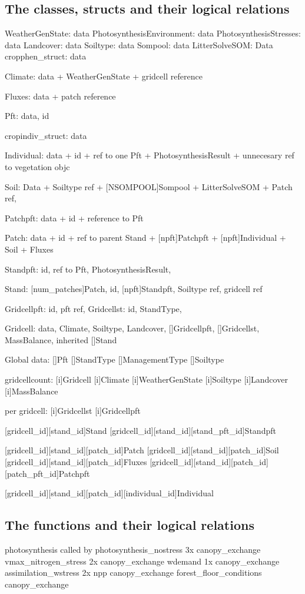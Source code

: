 \subsection{The classes, structs and their logical relations}
WeatherGenState: data
PhotosynthesisEnvironment: data
PhotosynthesisStresses: data
Landcover: data
Soiltype: data
Sompool: data
LitterSolveSOM: Data
cropphen_struct: data

Climate: data + WeatherGenState + gridcell reference

Fluxes: data + patch reference

Pft: data, id

cropindiv_struct: data

Individual: data + id + ref to one Pft + PhotosynthesisResult + unnecesary ref to vegetation objc

Soil: Data + Soiltype ref + [NSOMPOOL]Sompool + LitterSolveSOM + Patch ref,

Patchpft: data + id + reference to Pft

Patch: data + id + ref to parent Stand + [npft]Patchpft + [npft]Individual + Soil + Fluxes

Standpft: id, ref to Pft, PhotosynthesisResult,

Stand: [num_patches]Patch, id, [npft]Standpft, Soiltype ref, gridcell ref

Gridcellpft: id, pft ref,
Gridcellst: id, StandType,

Gridcell: data, Climate, Soiltype, Landcover, []Gridcellpft, []Gridcellst, MassBalance, inherited []Stand



Global data:
  []Pft
  []StandType
  []ManagementType
  []Soiltype

gridcellcount:
  [i]Gridcell
  [i]Climate
  [i]WeatherGenState
  [i]Soiltype
  [i]Landcover
  [i]MassBalance

per gridcell:
  [i]Gridcellst
  [i]Gridcellpft

  [gridcell_id][stand_id]Stand
  [gridcell_id][stand_id][stand_pft_id]Standpft

  [gridcell_id][stand_id][patch_id]Patch
  [gridcell_id][stand_id][patch_id]Soil
  [gridcell_id][stand_id][patch_id]Fluxes
  [gridcell_id][stand_id][patch_id][patch_pft_id]Patchpft

  [gridcell_id][stand_id][patch_id][individual_id]Individual

\subsection{The functions and their logical relations}
photosynthesis
  called by
    photosynthesis_nostress 3x
      canopy_exchange
    vmax_nitrogen_stress 2x
      canopy_exchange
    wdemand 1x
      canopy_exchange
    assimilation_wstress 2x
      npp
        canopy_exchange
      forest_floor_conditions
        canopy_exchange

